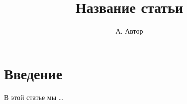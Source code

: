\documentclass{article}
\title{Название статьи}
\author{А. Автор}
\begin{document}
\maketitle
\section{Введение}
В этой статье мы \dots
\end{document}
